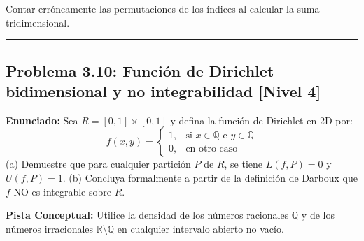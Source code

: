\documentclass[11pt,a4paper]{article}
\begin{document}
\begin{trapbox}
Contar erróneamente las permutaciones de los índices al calcular la suma tridimensional.
\end{trapbox}

\vspace{0.5cm}
\hrule
\vspace{0.5cm}

\subsection*{Problema 3.10: Función de Dirichlet bidimensional y no integrabilidad \hfill \color{primaryblue}\small[Nivel 4]}

\begin{tcolorbox}[colback=white,colframe=gray!40,arc=1mm,boxrule=0.5pt,left=3mm,right=3mm,top=2mm,bottom=2mm]
\textbf{Enunciado:} Sea $R = [0, 1] \times [0, 1]$ y defina la función de Dirichlet en 2D por:
\begin{equation*}
f(x,y) = \begin{cases} 1, & \text{si } x \in \mathbb{Q} \text{ e } y \in \mathbb{Q} \\ 0, & \text{en otro caso} \end{cases}
\end{equation*}
(a) Demuestre que para cualquier partición $P$ de $R$, se tiene $L(f, P) = 0$ y $U(f, P) = 1$.
(b) Concluya formalmente a partir de la definición de Darboux que $f$ NO es integrable sobre $R$.
\end{tcolorbox}

\begin{tcolorbox}[colback=yellow!4,colframe=accentamber!70,arc=1mm,boxrule=0.5pt,left=3mm,right=3mm,top=1.5mm,bottom=1.5mm]
\textbf{Pista Conceptual:} Utilice la densidad de los números racionales $\mathbb{Q}$ y de los números irracionales $\mathbb{R} \setminus \mathbb{Q}$ en cualquier intervalo abierto no vacío.
\end{tcolorbox}
\end{document}
